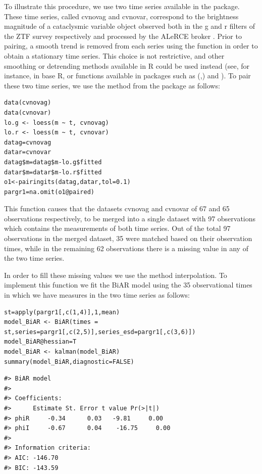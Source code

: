 To illustrate this procedure, we use two time series available in the  package. These time series, called cvnovag and cvnovar, correspond to the brightness magnitude of a cataclysmic variable object observed both in the g and r filters of the ZTF survey respectively and processed by the ALeRCE broker \citep{Forster_2021}. Prior to pairing, a smooth trend is removed from each series using the  function in order to obtain a stationary time series. This choice is not restrictive, and other smoothing or detrending methods available in R could be used instead (see, for instance,  in base R, or functions available in packages such as  (\citet{Wood2001},\citet{Wood2017}) and  \citep{HyndmanKhandakar2008}). To pair these two time series, we use the method  from the  package as follows:

\begin{verbatim}
data(cvnovag)
data(cvnovar)
lo.g <- loess(m ~ t, cvnovag)
lo.r <- loess(m ~ t, cvnovar)
datag=cvnovag
datar=cvnovar
datag$m=datag$m-lo.g$fitted
datar$m=datar$m-lo.r$fitted
o1<-pairingits(datag,datar,tol=0.1)
pargr1=na.omit(o1@paired)
\end{verbatim}

This function causes that the datasets cvnovag and cvnovar of 67 and 65 observations respectively, to be merged into a single dataset with 97 observations which contains the measurements of both time series. Out of the total 97 observations in the merged dataset, 35 were matched based on their observation times, while in the remaining 62 observations there is a missing value in any of the two time series.

In order to fill these missing values we use the method interpolation. To implement this function we fit the BiAR model using the 35 observational times in which we have measures in the two time series as follows:

\begin{verbatim}
st=apply(pargr1[,c(1,4)],1,mean)
model_BiAR <- BiAR(times = st,series=pargr1[,c(2,5)],series_esd=pargr1[,c(3,6)])
model_BiAR@hessian=T
model_BiAR <- kalman(model_BiAR)
summary(model_BiAR,diagnostic=FALSE)
\end{verbatim}

\begin{verbatim}
#> BiAR model
#> 
#> Coefficients:
#>      Estimate St. Error t value Pr(>|t|)
#> phiR     -0.34      0.03   -9.81     0.00
#> phiI     -0.67      0.04    -16.75     0.00
#> 
#> Information criteria:
#> AIC: -146.70 
#> BIC: -143.59
\end{verbatim}

